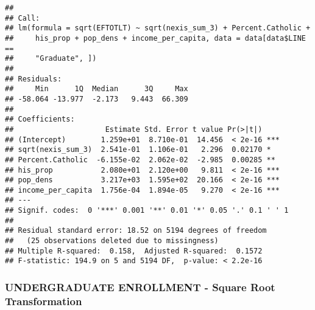\documentclass[]{article}
\newenvironment{Shaded}{\begin{snugshade}}{\end{snugshade}}
\newcommand{\KeywordTok}[1]{\textcolor[rgb]{0.13,0.29,0.53}{\textbf{#1}}}
\newcommand{\DataTypeTok}[1]{\textcolor[rgb]{0.13,0.29,0.53}{#1}}
\newcommand{\DecValTok}[1]{\textcolor[rgb]{0.00,0.00,0.81}{#1}}
\newcommand{\StringTok}[1]{\textcolor[rgb]{0.31,0.60,0.02}{#1}}
\newcommand{\OperatorTok}[1]{\textcolor[rgb]{0.81,0.36,0.00}{\textbf{#1}}}
\newcommand{\NormalTok}[1]{#1}
\begin{document}
\begin{verbatim}
## 
## Call:
## lm(formula = sqrt(EFTOTLT) ~ sqrt(nexis_sum_3) + Percent.Catholic + 
##     his_prop + pop_dens + income_per_capita, data = data[data$LINE == 
##     "Graduate", ])
## 
## Residuals:
##     Min      1Q  Median      3Q     Max 
## -58.064 -13.977  -2.173   9.443  66.309 
## 
## Coefficients:
##                     Estimate Std. Error t value Pr(>|t|)    
## (Intercept)        1.259e+01  8.710e-01  14.456  < 2e-16 ***
## sqrt(nexis_sum_3)  2.541e-01  1.106e-01   2.296  0.02170 *  
## Percent.Catholic  -6.155e-02  2.062e-02  -2.985  0.00285 ** 
## his_prop           2.080e+01  2.120e+00   9.811  < 2e-16 ***
## pop_dens           3.217e+03  1.595e+02  20.166  < 2e-16 ***
## income_per_capita  1.756e-04  1.894e-05   9.270  < 2e-16 ***
## ---
## Signif. codes:  0 '***' 0.001 '**' 0.01 '*' 0.05 '.' 0.1 ' ' 1
## 
## Residual standard error: 18.52 on 5194 degrees of freedom
##   (25 observations deleted due to missingness)
## Multiple R-squared:  0.158,  Adjusted R-squared:  0.1572 
## F-statistic: 194.9 on 5 and 5194 DF,  p-value: < 2.2e-16
\end{verbatim}

\subsubsection{UNDERGRADUATE ENROLLMENT - Square Root
Transformation}\label{undergraduate-enrollment---square-root-transformation-1}

\begin{Shaded}
\end{Shaded}
\end{document}
